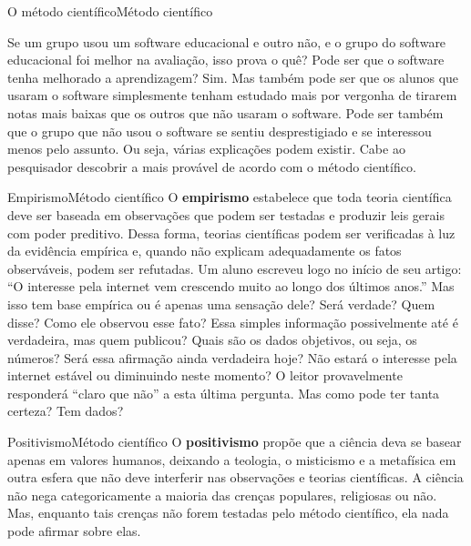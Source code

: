 \documentclass[t]{beamer}
\begin{document}

\begin{ftst}{O método científico}{Método científico}
\justifying

\footnotesize
Se um grupo usou um software educacional e outro não, e o grupo do software educacional foi melhor na avaliação, isso prova o quê? Pode ser que o software tenha melhorado a aprendizagem? Sim. Mas também pode ser que os alunos que usaram o software simplesmente tenham estudado mais por vergonha de tirarem notas mais baixas que os outros que não usaram o software. Pode ser também que o grupo que não usou o software se sentiu desprestigiado e se interessou menos pelo assunto. Ou seja, várias explicações podem existir. Cabe ao pesquisador descobrir a mais provável de acordo com o método científico.

\end{ftst}


\begin{ftst}{Empirismo}{Método científico}
\vone
\justifying
O \textbf{empirismo} estabelece que toda teoria científica deve ser baseada em observações que podem ser testadas e produzir leis gerais com poder preditivo. Dessa forma, teorias científicas podem ser verificadas à luz da evidência empírica e, quando não explicam adequadamente os fatos observáveis, podem ser refutadas.
\vone
\footnotesize
Um aluno escreveu logo no início de seu artigo: “O interesse pela internet vem crescendo muito ao longo dos últimos anos.”
Mas isso tem base empírica ou é apenas uma sensação dele? Será verdade? Quem disse? Como ele observou esse fato? Essa
simples informação possivelmente até é verdadeira, mas quem publicou? Quais são os dados objetivos, ou seja, os números?
Será essa afirmação ainda verdadeira hoje? Não estará o interesse pela internet estável ou diminuindo neste momento?
O leitor provavelmente responderá “claro que não” a esta última pergunta. Mas como pode ter tanta certeza? Tem dados?
\end{ftst}


\begin{ftst}{Positivismo}{Método científico}
\vone
\justifying
O \textbf{positivismo} propõe que a ciência deva se basear apenas em valores humanos, deixando a teologia, o misticismo e a metafísica em outra esfera que não deve interferir nas observações e teorias científicas.
\vone
A ciência não nega categoricamente a maioria das crenças populares, religiosas ou não. Mas, enquanto tais crenças não
forem testadas pelo método científico, ela nada pode afirmar sobre elas.


\end{ftst}
\end{document}
